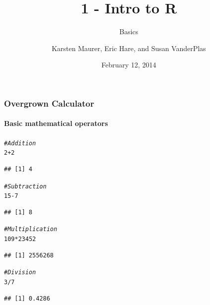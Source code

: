 \documentclass{beamer}\usepackage[]{graphicx}\usepackage[]{color}
\title[ 1-Intro]{1 - Intro to R}
\subtitle{Basics}
\author[ K. Maurer, S. VanderPlas, E. Hare]{Karsten Maurer, Eric Hare, and Susan VanderPlas}
\date{February 12, 2014}
\institute[ISU]{Iowa State University}
\makeatletter
\newcommand{\hlnum}[1]{\textcolor[rgb]{0.686,0.059,0.569}{#1}}%
\newcommand{\hlcom}[1]{\textcolor[rgb]{0.678,0.584,0.686}{\textit{#1}}}%
\newcommand{\hlopt}[1]{\textcolor[rgb]{0,0,0}{#1}}%
\newenvironment{kframe}{%
 \def\at@end@of@kframe{}%
 \ifinner\ifhmode%
  \def\at@end@of@kframe{\end{minipage}}%
  \begin{minipage}{\columnwidth}%
 \fi\fi%
 \def\FrameCommand##1{\hskip\@totalleftmargin \hskip-\fboxsep
 \colorbox{shadecolor}{##1}\hskip-\fboxsep
     \hskip-\linewidth \hskip-\@totalleftmargin \hskip\columnwidth}%
 \MakeFramed {\advance\hsize-\width
   \@totalleftmargin\z@ \linewidth\hsize
   \@setminipage}}%
 {\par\unskip\endMakeFramed%
 \at@end@of@kframe}
\newenvironment{knitrout}{}{} %
\makeatother
\begin{document}
\begin{frame}
    \maketitle
\end{frame}





\begin{frame}[fragile]
    \frametitle{Overgrown Calculator}
    \framesubtitle{Basic mathematical operators}
    
\begin{knitrout}\footnotesize
{}\color{fgcolor}\begin{kframe}
\begin{alltt}
\hlcom{# Addition}
\hlnum{2} \hlopt{+} \hlnum{2}
\end{alltt}
\begin{verbatim}
## [1] 4
\end{verbatim}
\begin{alltt}
\hlcom{# Subtraction}
\hlnum{15} \hlopt{-} \hlnum{7}
\end{alltt}
\begin{verbatim}
## [1] 8
\end{verbatim}
\begin{alltt}
\hlcom{# Multiplication}
\hlnum{109} \hlopt{*} \hlnum{23452}
\end{alltt}
\begin{verbatim}
## [1] 2556268
\end{verbatim}
\begin{alltt}
\hlcom{# Division}
\hlnum{3}\hlopt{/}\hlnum{7}
\end{alltt}
\begin{verbatim}
## [1] 0.4286
\end{verbatim}
\end{kframe}
\end{knitrout}

\end{frame}
\end{document}
